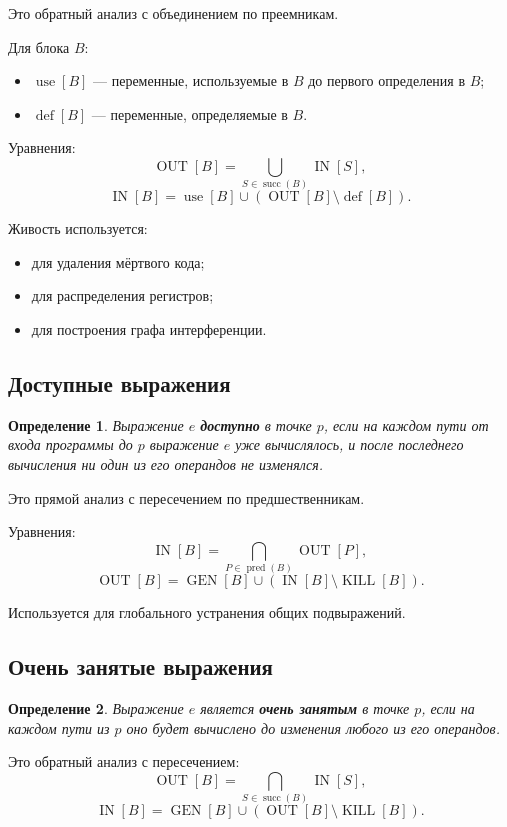\documentclass[12pt,a4paper]{article}
\newtheorem{definition}{Определение}
\DeclareMathOperator{\defop}{def}
\DeclareMathOperator{\useop}{use}
\DeclareMathOperator{\IN}{IN}
\DeclareMathOperator{\OUT}{OUT}
\DeclareMathOperator{\GEN}{GEN}
\DeclareMathOperator{\KILL}{KILL}
\DeclareMathOperator{\pred}{pred}
\DeclareMathOperator{\succs}{succ}
\begin{document}
Это обратный анализ с объединением по преемникам.

Для блока $B$:
\begin{itemize}
    \item $\useop[B]$ --- переменные, используемые в $B$ до первого определения в $B$;
    \item $\defop[B]$ --- переменные, определяемые в $B$.
\end{itemize}

Уравнения:
\[
\OUT[B] = \bigcup_{S\in \succs(B)} \IN[S],
\]
\[
\IN[B] = \useop[B] \cup (\OUT[B]\setminus \defop[B]).
\]

Живость используется:
\begin{itemize}
    \item для удаления мёртвого кода;
    \item для распределения регистров;
    \item для построения графа интерференции.
\end{itemize}

\subsection{Доступные выражения}

\begin{definition}
Выражение $e$ \textbf{доступно} в точке $p$, если на каждом пути от входа программы до $p$ выражение $e$ уже вычислялось, и после последнего вычисления ни один из его операндов не изменялся.
\end{definition}

Это прямой анализ с пересечением по предшественникам.

Уравнения:
\[
\IN[B] = \bigcap_{P\in\pred(B)} \OUT[P],
\]
\[
\OUT[B] = \GEN[B] \cup (\IN[B]\setminus \KILL[B]).
\]

Используется для глобального устранения общих подвыражений.

\subsection{Очень занятые выражения}

\begin{definition}
Выражение $e$ является \textbf{очень занятым} в точке $p$, если на каждом пути из $p$ оно будет вычислено до изменения любого из его операндов.
\end{definition}

Это обратный анализ с пересечением:
\[
\OUT[B] = \bigcap_{S\in\succs(B)} \IN[S],
\]
\[
\IN[B] = \GEN[B] \cup (\OUT[B]\setminus \KILL[B]).
\]
\end{document}
